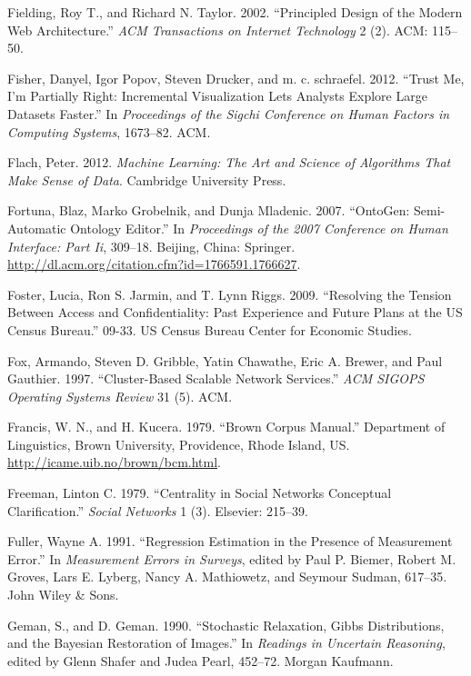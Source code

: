 \documentclass[]{krantz}
\begin{document}
\hypertarget{ref-fielding2002principled}{}
Fielding, Roy T., and Richard N. Taylor. 2002. ``Principled Design of
the Modern Web Architecture.'' \emph{ACM Transactions on Internet
Technology} 2 (2). ACM: 115--50.

\hypertarget{ref-fisher2012trust}{}
Fisher, Danyel, Igor Popov, Steven Drucker, and m. c. schraefel. 2012.
``Trust Me, I'm Partially Right: Incremental Visualization Lets Analysts
Explore Large Datasets Faster.'' In \emph{Proceedings of the Sigchi
Conference on Human Factors in Computing Systems}, 1673--82. ACM.

\hypertarget{ref-Flach}{}
Flach, Peter. 2012. \emph{Machine Learning: The Art and Science of
Algorithms That Make Sense of Data}. Cambridge University Press.

\hypertarget{ref-Ontogen}{}
Fortuna, Blaz, Marko Grobelnik, and Dunja Mladenic. 2007. ``OntoGen:
Semi-Automatic Ontology Editor.'' In \emph{Proceedings of the 2007
Conference on Human Interface: Part Ii}, 309--18. Beijing, China:
Springer. \url{http://dl.acm.org/citation.cfm?id=1766591.1766627}.

\hypertarget{ref-foster2009resolving}{}
Foster, Lucia, Ron S. Jarmin, and T. Lynn Riggs. 2009. ``Resolving the
Tension Between Access and Confidentiality: Past Experience and Future
Plans at the US Census Bureau.'' 09-33. US Census Bureau Center for
Economic Studies.

\hypertarget{ref-fox1997cluster}{}
Fox, Armando, Steven D. Gribble, Yatin Chawathe, Eric A. Brewer, and
Paul Gauthier. 1997. ``Cluster-Based Scalable Network Services.''
\emph{ACM SIGOPS Operating Systems Review} 31 (5). ACM.

\hypertarget{ref-browncorpus}{}
Francis, W. N., and H. Kucera. 1979. ``Brown Corpus Manual.'' Department
of Linguistics, Brown University, Providence, Rhode Island, US.
\url{http://icame.uib.no/brown/bcm.html}.

\hypertarget{ref-freeman1979centrality}{}
Freeman, Linton C. 1979. ``Centrality in Social Networks Conceptual
Clarification.'' \emph{Social Networks} 1 (3). Elsevier: 215--39.

\hypertarget{ref-fuller1991regression}{}
Fuller, Wayne A. 1991. ``Regression Estimation in the Presence of
Measurement Error.'' In \emph{Measurement Errors in Surveys}, edited by
Paul P. Biemer, Robert M. Groves, Lars E. Lyberg, Nancy A. Mathiowetz,
and Seymour Sudman, 617--35. John Wiley \& Sons.

\hypertarget{ref-geman-90}{}
Geman, S., and D. Geman. 1990. ``Stochastic Relaxation, Gibbs
Distributions, and the Bayesian Restoration of Images.'' In
\emph{Readings in Uncertain Reasoning}, edited by Glenn Shafer and Judea
Pearl, 452--72. Morgan Kaufmann.
\end{document}
